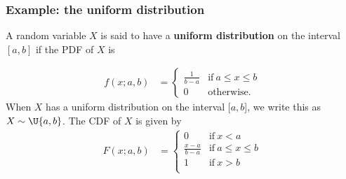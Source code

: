 \documentclass[9pt]{beamer}
\begin{document}
\begin{frame}
\frametitle{Example: the uniform distribution}

\begin{definition}
A random variable $X$ is said to have a \textbf{uniform distribution} on the interval ${[a, b]}$ if the PDF of $X$ is

\vspace{-.5cm}

\begin{align*}
    f(x; a, b) &= 
    \begin{cases}
      \frac{1}{b-a} & \text{if}\ a \leq x \leq b \\
      0 & \text{otherwise.}
    \end{cases}
\end{align*}
When $X$ has a uniform distribution on the interval [$a, b$], we write this as $X \sim \U{a,b}$. The CDF of $X$ is given by
\begin{align*}
F(x; a, b) &= 
    \begin{cases}
      0 & \text{if}\ x < a \\
      \frac{x-a}{b-a} & \text{if}\ a \leq x \leq b \\
      1 &\text{if}\ x > b \\
    \end{cases}
\end{align*}
\end{definition}


\

\

\end{frame}
\end{document}
